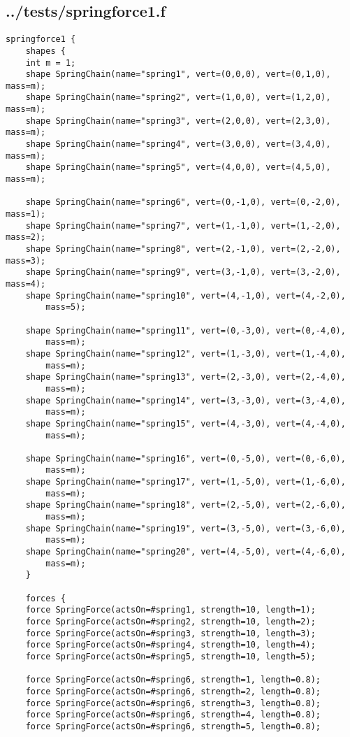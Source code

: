 \subsection*{../tests/springforce1.f}
\begin{lstlisting}
springforce1 {
    shapes {
	int m = 1;
	shape SpringChain(name="spring1", vert=(0,0,0), vert=(0,1,0), mass=m);
	shape SpringChain(name="spring2", vert=(1,0,0), vert=(1,2,0), mass=m);
	shape SpringChain(name="spring3", vert=(2,0,0), vert=(2,3,0), mass=m);
	shape SpringChain(name="spring4", vert=(3,0,0), vert=(3,4,0), mass=m);
	shape SpringChain(name="spring5", vert=(4,0,0), vert=(4,5,0), mass=m);

	shape SpringChain(name="spring6", vert=(0,-1,0), vert=(0,-2,0), mass=1);
	shape SpringChain(name="spring7", vert=(1,-1,0), vert=(1,-2,0), mass=2);
	shape SpringChain(name="spring8", vert=(2,-1,0), vert=(2,-2,0), mass=3);
	shape SpringChain(name="spring9", vert=(3,-1,0), vert=(3,-2,0), mass=4);
	shape SpringChain(name="spring10", vert=(4,-1,0), vert=(4,-2,0),
		mass=5);

	shape SpringChain(name="spring11", vert=(0,-3,0), vert=(0,-4,0),
		mass=m);
	shape SpringChain(name="spring12", vert=(1,-3,0), vert=(1,-4,0),
		mass=m);
	shape SpringChain(name="spring13", vert=(2,-3,0), vert=(2,-4,0),
		mass=m);
	shape SpringChain(name="spring14", vert=(3,-3,0), vert=(3,-4,0),
		mass=m);
	shape SpringChain(name="spring15", vert=(4,-3,0), vert=(4,-4,0),
		mass=m);

	shape SpringChain(name="spring16", vert=(0,-5,0), vert=(0,-6,0),
		mass=m);
	shape SpringChain(name="spring17", vert=(1,-5,0), vert=(1,-6,0),
		mass=m);
	shape SpringChain(name="spring18", vert=(2,-5,0), vert=(2,-6,0),
		mass=m);
	shape SpringChain(name="spring19", vert=(3,-5,0), vert=(3,-6,0),
		mass=m);
	shape SpringChain(name="spring20", vert=(4,-5,0), vert=(4,-6,0),
		mass=m);
    }

    forces {
	force SpringForce(actsOn=#spring1, strength=10, length=1);
	force SpringForce(actsOn=#spring2, strength=10, length=2);
	force SpringForce(actsOn=#spring3, strength=10, length=3);
	force SpringForce(actsOn=#spring4, strength=10, length=4);
	force SpringForce(actsOn=#spring5, strength=10, length=5);

	force SpringForce(actsOn=#spring6, strength=1, length=0.8);
	force SpringForce(actsOn=#spring6, strength=2, length=0.8);
	force SpringForce(actsOn=#spring6, strength=3, length=0.8);
	force SpringForce(actsOn=#spring6, strength=4, length=0.8);
	force SpringForce(actsOn=#spring6, strength=5, length=0.8);


\end{lstlisting}
